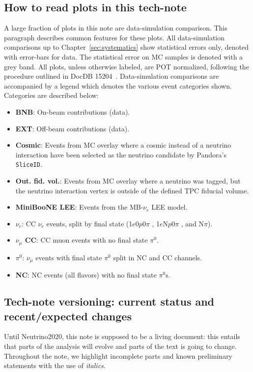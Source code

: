 \documentclass[a4paper]{article}
\newcommand{\npsel}{1$e$N$p$0$\pi$ }
\newcommand{\zpsel}{1$e$0$p$0$\pi$ }
\begin{document}
\subsection{How to read plots in this tech-note} A large fraction of plots in this note are data-simulation comparison. This paragraph describes common features for these plots. All data-simulation comparisons up to Chapter~\ref{sec:systematics} show statistical errors only, denoted with error-bars for data. The statistical error on MC samples is denoted with a grey band. All plots, unless otherwise labeled, are POT normalized, following the procedure outlined in DocDB 15204~\cite{bib:POTscaling}. Data-simulation comparisons are accompanied by a legend which denotes the various event categories shown. Categories are described below:
\begin{itemize}
    \item \textbf{BNB}: On-beam contributions (data).
    \item \textbf{EXT}: Off-beam contributions (data).
    \item \textbf{Cosmic}: Events from MC overlay where a cosmic instead of a neutrino interaction have been selected as the neutrino candidate by Pandora's \texttt{SliceID}.
    \item \textbf{Out. fid. vol.}: Events from MC overlay where a neutrino was tagged, but the neutrino interaction vertex is outside of the defined TPC fiducial volume.
    \item \textbf{MiniBooNE LEE}: Events from the MB-$\nu_e$ LEE model.
    \item \textbf{$\nu_e$}: CC $\nu_e$ events, split by final state (\zpsel, \npsel, and N$\pi$).
    \item \textbf{$\nu_{\mu}$ CC}: CC muon events with no final state $\pi^0$.
    \item \textbf{$\pi^0$}: $\nu_{\mu}$ events with final state $\pi^0$ split in NC and CC channels.
    \item \textbf{NC}: NC events (all flavors) with no final state $\pi^0$s.
\end{itemize}{}

\subsection{Tech-note versioning: current status and recent/expected changes }
Until Neutrino2020, this note is supposed to be a living document: this entails that parts of the analysis will evolve and parts of the text is going to change. Throughout the note, we highlight incomplete parts and known preliminary statements with the use of \emph{italics}.
\end{document}
